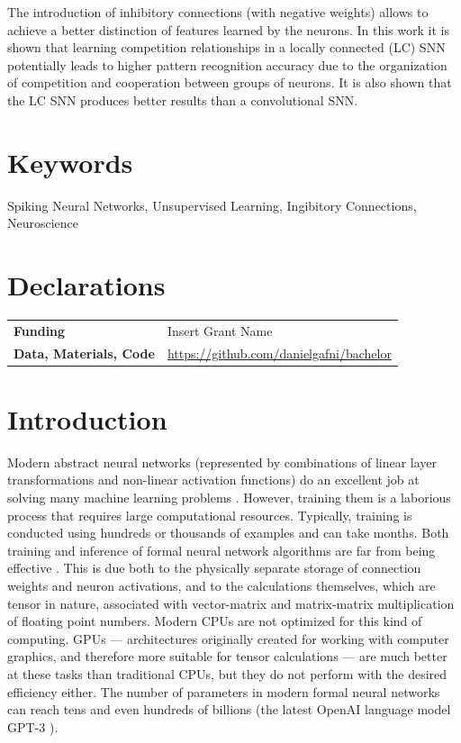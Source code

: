 \documentclass[a4paper,10pt]{article}
\begin{document}
The introduction of inhibitory connections (with negative weights) allows to achieve a better distinction of features learned by the neurons. In this work it is shown that learning competition relationships in a locally connected (LC) SNN potentially leads to higher pattern recognition accuracy due to the organization of competition and cooperation between groups of neurons. It is also shown that the LC SNN produces better results than a convolutional SNN.

\section*{Keywords}
Spiking Neural Networks, Unsupervised Learning, Ingibitory Connections, Neuroscience

\section*{Declarations}

\begin{flushleft}
 \begin{tabularx}{\textwidth}{lm{10cm}}
  \textbf{Funding} & {Insert Grant Name} \\
  \textbf{Data, Materials, Code} & {\href{https://github.com/danielgafni/bachelor}{https://github.com/danielgafni/bachelor}} \\
 \end{tabularx}
\end{flushleft}



\pagebreak

\section*{Introduction}

Modern abstract neural networks (represented by combinations of linear layer transformations and non-linear activation functions) do an excellent job at solving many machine learning problems \cite{pmlr-v28-wan13, Khan_2020}. However, training them is a laborious process that requires large computational resources. Typically, training is conducted using hundreds or thousands of examples and can take months. Both training and inference of formal neural network algorithms are far from being effective \cite{Edwards2015GrowingPF}. This is due both to the physically separate storage of connection weights and neuron activations, and to the calculations themselves, which are tensor in nature, associated with vector-matrix and matrix-matrix multiplication of floating point numbers. Modern CPUs are not optimized for this kind of computing. GPUs --- architectures originally created for working with computer graphics, and therefore more suitable for tensor calculations --- are much better at these tasks than traditional CPUs, but they do not perform with the desired efficiency either. The number of parameters in modern formal neural networks can reach tens \cite{ManyParams, Khan_2020} and even hundreds of billions (the latest OpenAI language model GPT-3 \cite{brown2020language}).
\end{document}
